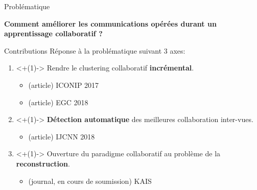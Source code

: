 \documentclass[hyperref={pdfpagelabels=false}]{beamer}
\begin{document}
    \begin{frame}{Problématique}
            \begin{center}
                \fontsize{14pt}{15pt}
                \textbf{Comment améliorer les communications opérées durant un 
                apprentissage collaboratif ?}
            \end{center}
    \end{frame}

    \begin{frame}{Contributions}
        Réponse à la problématique suivant 3 axes:
        \begin{enumerate}
            \item<+(1)-> Rendre le clustering collaboratif \textbf{incrémental}.
                \begin{itemize}
                    \item (article) ICONIP 2017
                    \item (article) EGC 2018
                \end{itemize}
            \item<+(1)-> \textbf{Détection automatique} des meilleures 
                collaboration inter-vues.
                \begin{itemize}
                    \item (article) IJCNN 2018
                \end{itemize}
            \item<+(1)-> Ouverture du paradigme collaboratif au problème de la 
                \textbf{reconstruction}.
                \begin{itemize}
                    \item (journal, en cours de soumission) KAIS
                \end{itemize}
        \end{enumerate}
    \end{frame}
\end{document}
